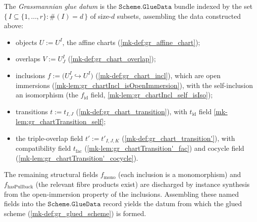 \begin{definition}\label{mk-def:gr_the_glue_data}
  \leanok

  The \emph{Grassmannian glue datum} is the \(\mathtt{Scheme.GlueData}\) bundle
  indexed by the set \(\{\, I \subseteq \{1,\dots,r\} : \#(I) = d \,\}\) of
  size-\(d\) subsets, assembling the data constructed above:
  \begin{itemize}
    \item objects \(U := U^I\), the affine charts (\ref{mk-def:gr_affine_chart});
    \item overlaps \(V := U^I_J\) (\ref{mk-def:gr_chart_overlap});
    \item inclusions \(f := \bigl(U^I_J \hookrightarrow U^I\bigr)\)
      (\ref{mk-def:gr_chart_incl}), which are open immersions
      (\ref{mk-lem:gr_chartIncl_isOpenImmersion}), with the self-inclusion an
      isomorphism (the \(f_{\mathrm{id}}\) field,
      \ref{mk-lem:gr_chartIncl_self_isIso});
    \item transitions \(t := t_{I,J}\) (\ref{mk-def:gr_chart_transition}), with
      \(t_{\mathrm{id}}\) field \ref{mk-lem:gr_chartTransition_self};
    \item the triple-overlap field \(t' := t'_{I,J,K}\)
      (\ref{mk-def:gr_chart_transition'}), with compatibility field
      \(t_{\mathrm{fac}}\) (\ref{mk-lem:gr_chartTransition'_fac}) and \(\mathrm{cocycle}\)
      field (\ref{mk-lem:gr_chartTransition'_cocycle}).
  \end{itemize}
  The remaining structural fields \(f_{\mathrm{mono}}\) (each inclusion is a
  monomorphism) and \(f_{\mathrm{hasPullback}}\) (the relevant fibre products
  exist) are discharged by instance synthesis from the open-immersion property of
  the inclusions. Assembling these named fields into the
  \(\mathtt{Scheme.GlueData}\) record yields the datum from which the glued scheme
  (\ref{mk-def:gr_glued_scheme}) is formed.
\end{definition}

